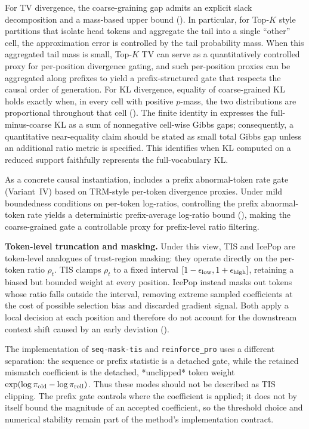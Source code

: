 For TV divergence, the coarse-graining gap admits an explicit slack decomposition and a mass-based upper bound (). In
particular, for Top-$K$ style partitions that isolate head tokens and aggregate the tail into a single ``other'' cell, the approximation
error is controlled by the tail probability mass. When this aggregated tail mass is small, Top-$K$ TV can serve as a quantitatively
controlled proxy for per-position divergence gating, and such per-position proxies can be aggregated along prefixes to yield a
prefix-structured gate that respects the causal order of generation. For KL divergence, equality of coarse-grained KL holds exactly when, in every
cell with positive $p$-mass, the two distributions are proportional
throughout that cell (). The finite identity in
 expresses the full-minus-coarse KL as a sum of
nonnegative cell-wise Gibbs gaps; consequently, a quantitative near-equality
claim should be stated as small total Gibbs gap unless an additional ratio
metric is specified. This identifies when KL computed on a reduced support
faithfully represents the full-vocabulary KL.

As a concrete causal instantiation,  includes a prefix abnormal-token rate gate (Variant~IV) based on TRM-style
per-token divergence proxies. Under mild boundedness conditions on per-token log-ratios, controlling the prefix abnormal-token rate yields
a deterministic prefix-average log-ratio bound (), making the coarse-grained gate a controllable proxy for
prefix-level ratio filtering.

\textbf{Token-level truncation and masking.} Under this view, TIS and IcePop are token-level analogues of trust-region masking: they operate
directly on the per-token ratio $\rho_t$. TIS clamps $\rho_t$ to a fixed interval $[1-\epsilon_{\mathrm{low}}, 1+\epsilon_{\mathrm{high}}]$, retaining a biased but bounded
weight at every position. IcePop instead masks out tokens whose ratio falls outside the interval, removing extreme sampled coefficients at the
cost of possible selection bias and discarded gradient signal. Both apply a local decision at each position and therefore do not account for the downstream context shift caused
by an early deviation ().

The implementation of \texttt{seq-mask-tis} and \texttt{reinforce\_pro} uses a
different separation: the sequence or prefix statistic is a detached gate,
while the retained mismatch coefficient is the detached, *unclipped* token
weight $\exp(\log\pi_{\mathrm{old}}-\log\pi_{\mathrm{roll}})$. Thus these modes should not be described
as TIS clipping. The prefix gate controls where the coefficient is applied;
it does not by itself bound the magnitude of an accepted coefficient, so the
threshold choice and numerical stability remain part of the method's
implementation contract.

